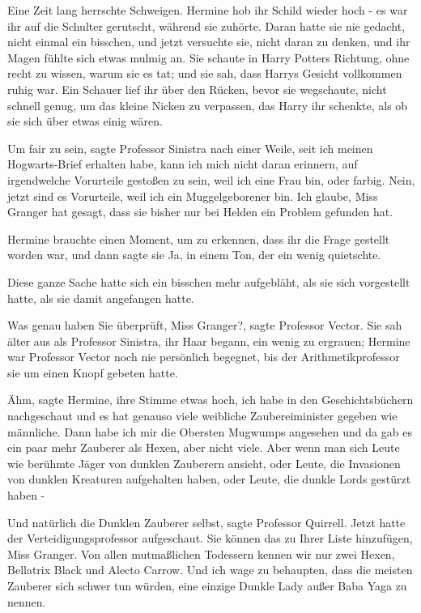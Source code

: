 Eine Zeit lang herrschte Schweigen. Hermine hob ihr Schild wieder hoch - es war
ihr auf die Schulter gerutscht, während sie zuhörte. Daran hatte sie nie
gedacht, nicht einmal ein bisschen, und jetzt versuchte sie, nicht daran zu
denken, und ihr Magen fühlte sich etwas mulmig an. Sie schaute in Harry Potters
Richtung, ohne recht zu wissen, warum sie es tat; und sie sah, dass Harrys
Gesicht vollkommen ruhig war. Ein Schauer lief ihr über den Rücken, bevor sie
wegschaute, nicht schnell genug, um das kleine Nicken zu verpassen, das Harry
ihr schenkte, als ob sie sich über etwas einig wären.

\glqq{}Um fair zu sein\grqq{}, sagte Professor Sinistra nach einer Weile, \glqq{}
seit ich meinen Hogwarts-Brief erhalten habe, kann ich mich nicht daran
erinnern, auf irgendwelche Vorurteile gestoßen zu sein, weil ich eine Frau bin,
oder farbig. Nein, jetzt sind es Vorurteile, weil ich ein Muggelgeborener bin.
Ich glaube, Miss Granger hat gesagt, dass sie bisher nur bei Helden ein Problem
gefunden hat.\grqq{}

Hermine brauchte einen Moment, um zu erkennen, dass ihr die Frage gestellt
worden war, und dann sagte sie \glqq{}Ja\grqq{}, in einem Ton, der ein wenig
quietschte.

Diese ganze Sache hatte sich ein bisschen mehr aufgebläht, als sie sich
vorgestellt hatte, als sie damit angefangen hatte.

\glqq{}Was genau haben Sie überprüft, Miss Granger?\grqq{}, sagte Professor
Vector. Sie sah älter aus als Professor Sinistra, ihr Haar begann, ein wenig zu
ergrauen; Hermine war Professor Vector noch nie persönlich begegnet, bis der
Arithmetikprofessor sie um einen Knopf gebeten hatte.

\glqq{}Ähm\grqq{}, sagte Hermine, ihre Stimme etwas hoch, \glqq{}ich habe in den
Geschichtsbüchern nachgeschaut und es hat genauso viele weibliche
Zaubereiminister gegeben wie männliche. Dann habe ich mir die Obersten Mugwumps
angesehen und da gab es ein paar mehr Zauberer als Hexen, aber nicht viele. Aber
wenn man sich Leute wie berühmte Jäger von dunklen Zauberern ansieht, oder
Leute, die Invasionen von dunklen Kreaturen aufgehalten haben, oder Leute, die
dunkle Lords gestürzt haben -\grqq{}

\glqq{}Und natürlich die Dunklen Zauberer selbst\grqq{}, sagte Professor
Quirrell. Jetzt hatte der Verteidigungsprofessor aufgeschaut. \glqq{}Sie können
das zu Ihrer Liste hinzufügen, Miss Granger. Von allen mutmaßlichen Todessern
kennen wir nur zwei Hexen, Bellatrix Black und Alecto Carrow. Und ich wage zu
behaupten, dass die meisten Zauberer sich schwer tun würden, eine einzige Dunkle
Lady außer Baba Yaga zu nennen.\grqq{}

